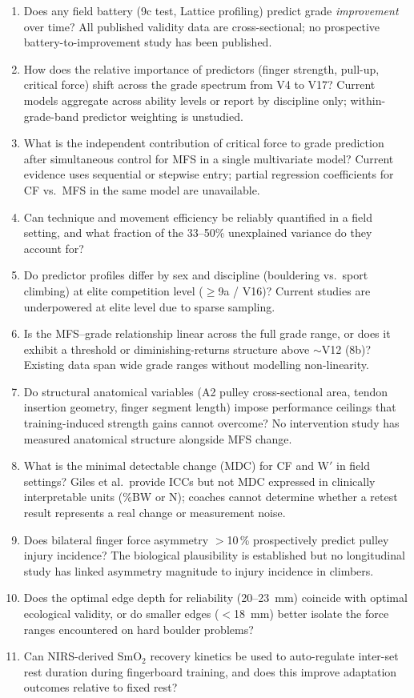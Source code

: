 \begin{enumerate}[leftmargin=1.5em]
  \item Does any field battery (9c test, Lattice profiling) predict grade \emph{improvement} over time? All published validity data are cross-sectional; no prospective battery-to-improvement study has been published.
  \item How does the relative importance of predictors (finger strength, pull-up, critical force) shift across the grade spectrum from V4 to V17? Current models aggregate across ability levels or report by discipline only; within-grade-band predictor weighting is unstudied.
  \item What is the independent contribution of critical force to grade prediction after simultaneous control for MFS in a single multivariate model? Current evidence uses sequential or stepwise entry; partial regression coefficients for CF vs.\ MFS in the same model are unavailable.
  \item Can technique and movement efficiency be reliably quantified in a field setting, and what fraction of the 33--50\% unexplained variance do they account for?
  \item Do predictor profiles differ by sex and discipline (bouldering vs.\ sport climbing) at elite competition level ($\geq$9a / V16)? Current studies are underpowered at elite level due to sparse sampling.
  \item Is the MFS--grade relationship linear across the full grade range, or does it exhibit a threshold or diminishing-returns structure above $\sim$V12 (8b)? Existing data span wide grade ranges without modelling non-linearity.
  \item Do structural anatomical variables (A2 pulley cross-sectional area, tendon insertion geometry, finger segment length) impose performance ceilings that training-induced strength gains cannot overcome? No intervention study has measured anatomical structure alongside MFS change.
  \item What is the minimal detectable change (MDC) for CF and W$'$ in field settings? Giles et al.\ provide ICCs but not MDC expressed in clinically interpretable units (\%BW or N); coaches cannot determine whether a retest result represents a real change or measurement noise.
  \item Does bilateral finger force asymmetry $>$10\,\% prospectively predict pulley injury incidence? The biological plausibility is established but no longitudinal study has linked asymmetry magnitude to injury incidence in climbers.
  \item Does the optimal edge depth for reliability (20--23~mm) coincide with optimal ecological validity, or do smaller edges ($<$18~mm) better isolate the force ranges encountered on hard boulder problems?
  \item Can NIRS-derived SmO$_2$ recovery kinetics be used to auto-regulate inter-set rest duration during fingerboard training, and does this improve adaptation outcomes relative to fixed rest?
\end{enumerate}
